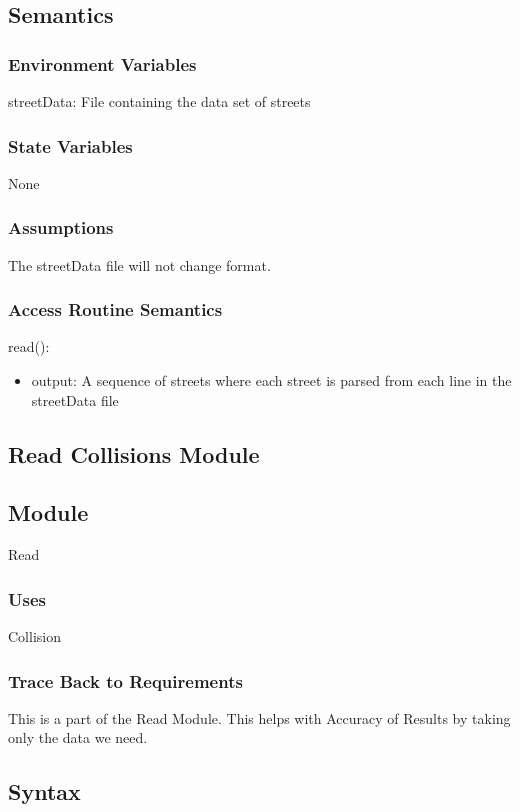 \documentclass[12pt]{article}
\begin{document}
\subsection*{Semantics}
\subsubsection*{Environment Variables}
streetData: File containing the data set of streets

\subsubsection*{State Variables}
None

\subsubsection*{Assumptions}
The streetData file will not change format.

\subsubsection*{Access Routine Semantics}

read():
\begin{itemize}
    \item output: A sequence of streets where each street is parsed from each line in the streetData file
\end{itemize}

\newpage
\subsection{Read Collisions Module}
\subsection*{Module}
Read

\subsubsection*{Uses}
Collision

\subsubsection*{Trace Back to Requirements}
This is a part of the Read Module. This helps with Accuracy of Results by taking only the data we need.

\subsection*{Syntax}
\end{document}
